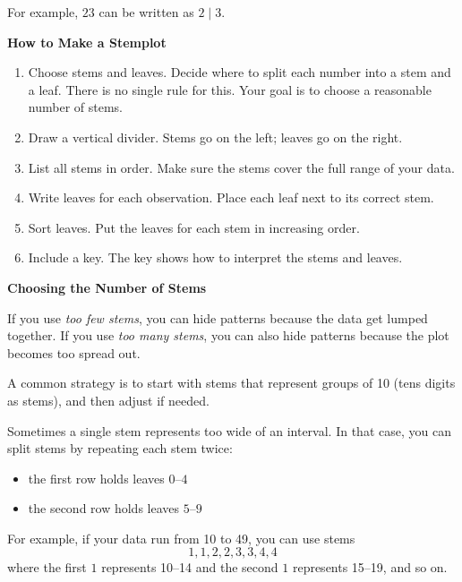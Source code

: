 For example, $23$ can be written as $2 \mid 3$.

\textbf{How to Make a Stemplot}
\begin{enumerate}
    \item Choose stems and leaves. Decide where to split each number into a stem and a leaf.
    There is no single rule for this. Your goal is to choose a reasonable number of stems.
    \item Draw a vertical divider. Stems go on the left; leaves go on the right.
    \item List all stems in order. Make sure the stems cover the full range of your data.
    \item Write leaves for each observation. Place each leaf next to its correct stem.
    \item Sort leaves. Put the leaves for each stem in increasing order.
    \item Include a key. The key shows how to interpret the stems and leaves.
\end{enumerate}

\textbf{Choosing the Number of Stems}

If you use \textit{too few stems}, you can hide patterns because the data get lumped together.
If you use \textit{too many stems}, you can also hide patterns because the plot becomes too spread out.

A common strategy is to start with stems that represent groups of 10 (tens digits as stems),
and then adjust if needed.

Sometimes a single stem represents too wide of an interval. In that case, you can split stems
by repeating each stem twice:
\begin{itemize}
    \item the first row holds leaves $0$--$4$
    \item the second row holds leaves $5$--$9$
\end{itemize}

For example, if your data run from 10 to 49, you can use stems
\[
1, 1, 2, 2, 3, 3, 4, 4
\]
where the first $1$ represents 10--14 and the second $1$ represents 15--19, and so on.

